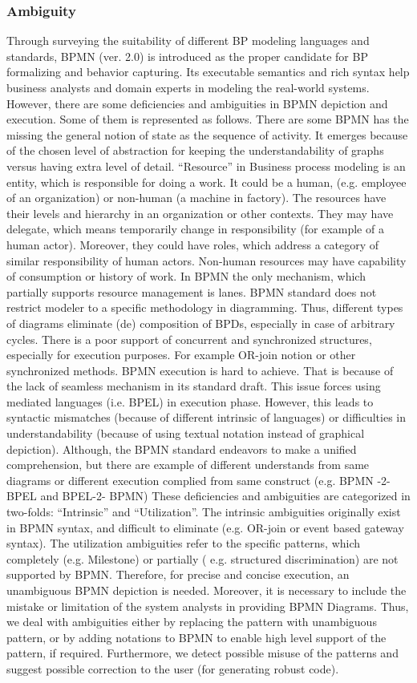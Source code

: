 \documentclass{article}
\begin{document}
\subsubsection{Ambiguity}
Through surveying the suitability of different BP modeling languages and standards, BPMN (ver. 2.0) is introduced as the proper candidate for BP formalizing and behavior capturing. Its executable semantics and rich syntax help business analysts and domain experts in modeling the real-world systems. However, there are some deficiencies and ambiguities in BPMN depiction and execution. Some of them is represented as follows.
There are some BPMN has the missing the general notion of state as the sequence of activity. It emerges because of the chosen level of abstraction for keeping the understandability of graphs versus having extra level of detail. “Resource” in Business process modeling is an entity, which is responsible for doing a work. It could be a human, (e.g. employee of an organization) or non-human (a machine in factory). The resources have their levels and hierarchy in an organization or other contexts. They may have delegate, which means temporarily change in responsibility (for example of a human actor). Moreover, they could have roles, which address a category of similar responsibility of human actors. Non-human resources may have capability of consumption or history of work. In BPMN the only mechanism, which partially supports resource management is lanes.
BPMN standard does not restrict modeler to a specific methodology in diagramming. Thus, different types of diagrams eliminate (de) composition of BPDs, especially in case of arbitrary cycles. There is a poor support of concurrent and synchronized structures, especially for execution purposes. For example OR-join notion or other synchronized methods. BPMN execution is hard to achieve. That is because of the lack of seamless mechanism in its standard draft. This issue forces using mediated languages (i.e. BPEL) in execution phase. However, this leads to syntactic mismatches (because of different intrinsic of languages) or difficulties in understandability (because of using textual notation instead of graphical depiction). Although, the BPMN standard endeavors to make a unified comprehension, but there are example of different understands from same diagrams or different execution complied from same construct (e.g. BPMN -2-BPEL and BPEL-2- BPMN)  
These deficiencies and ambiguities are categorized in two-folds: “Intrinsic” and “Utilization”. The intrinsic ambiguities originally exist in BPMN syntax, and difficult to eliminate (e.g. OR-join or event based gateway syntax). The utilization ambiguities refer to the specific patterns, which completely (e.g. Milestone) or partially ( e.g. structured discrimination) are not supported by BPMN.
Therefore, for precise and concise execution, an unambiguous BPMN depiction is needed. Moreover, it is necessary to include the mistake or limitation of the system analysts in providing BPMN Diagrams. Thus, we deal with ambiguities either by replacing the pattern with unambiguous pattern, or by adding notations to BPMN to enable high level support of the pattern, if required. Furthermore, we detect possible misuse of the patterns and suggest possible correction to the user (for generating robust code).
\end{document}
